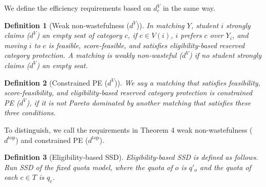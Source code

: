 \documentclass{article}
\newtheorem{definition}{Definition}
\begin{document}
We define the efficiency requirements based on $d^V_c$ in the same way.
\begin{definition}[Weak non-wastefulness ($d^V$)]
In matching $Y$, student $i$ strongly claims ($d^V$) an empty seat of category $c$,
if $c\in V(i)$, $i$ prefers $c$ over $Y_i$, and moving $i$ to $c$ is feasible, score-feasible,
and satisfies eligibility-based reserved category protection.
A matching is weakly non-wasteful ($d^V$) if no student strongly claims ($d^V$) an empty seat.
\end{definition}

\begin{definition}[Constrained PE ($d^V$)]
We say a matching that satisfies feasibility, score-feasibility, and eligibility-based
reserved category protection is constrained PE ($d^V$),
if it is not Pareto dominated by another matching that satisfies these three conditions.
\end{definition}
To distinguish, we call the requirements in Theorem 4 weak non-wastefulness
($d^{\mathrm{top}}$) and constrained PE ($d^{\mathrm{top}}$).

\begin{definition}[Eligibility-based SSD]
Eligibility-based SSD is defined as follows.
Run SSD of the fixed quota model, where the quota of $o$ is $q'_o$ and
the quota of each $c\in T$ is $q_c$.
\end{definition}
\end{document}
